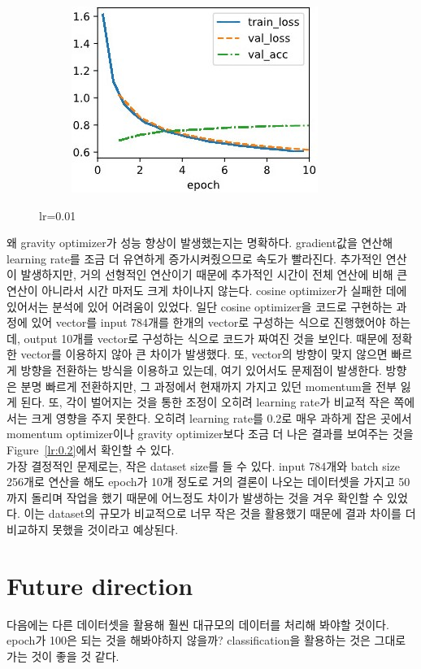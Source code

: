 \documentclass{article}
\begin{document}
\begin{figure}[ht]
\begin{center}
\begin{subfigure}[b]{0.3\columnwidth}
   \includegraphics[width=\columnwidth]{img/lr0.01 cosine0.01.jpg}
\end{subfigure}
\caption{lr=0.01}
\label{lr:0.01}
\end{center}
\end{figure}

왜 gravity optimizer가 성능 향상이 발생했는지는 명확하다. gradient값을 연산해 learning rate를 조금 더 유연하게 증가시켜줬으므로 속도가 빨라진다. 추가적인 연산이 발생하지만, 거의 선형적인 연산이기 때문에 추가적인 시간이 전체 연산에 비해 큰 연산이 아니라서 시간 마저도 크게 차이나지 않는다.
cosine optimizer가 실패한 데에 있어서는 분석에 있어 어려움이 있었다. 일단 cosine optimizer을 코드로 구현하는 과정에 있어 vector를 input 784개를 한개의 vector로 구성하는 식으로 진행했어야 하는데, output 10개를 vector로 구성하는 식으로 코드가 짜여진 것을 보인다. 때문에 정확한 vector를 이용하지 않아 큰 차이가 발생했다. 또, vector의 방향이 맞지 않으면 빠르게 방향을 전환하는 방식을 이용하고 있는데, 여기 있어서도 문제점이 발생한다. 방향은 분명 빠르게 전환하지만, 그 과정에서 현재까지 가지고 있던 momentum을 전부 잃게 된다. 또, 각이 벌어지는 것을 통한 조정이 오히려 learning rate가 비교적 작은 쪽에서는 크게 영향을 주지 못한다. 오히려 learning rate를 0.2로 매우 과하게 잡은 곳에서 momentum optimizer이나 gravity optimizer보다 조금 더 나은 결과를 보여주는 것을 Figure~\ref{lr:0.2}에서 확인할 수 있다.\\
가장 결정적인 문제로는, 작은 dataset size를 들 수 있다. input 784개와 batch size 256개로 연산을 해도 epoch가 10개 정도로 거의 결론이 나오는 데이터셋을 가지고 50까지 돌리며 작업을 했기 때문에 어느정도 차이가 발생하는 것을 겨우 확인할 수 있었다. 이는 dataset의 규모가 비교적으로 너무 작은 것을 활용했기 때문에 결과 차이를 더 비교하지 못했을 것이라고 예상된다.

\section{Future direction}
다음에는 다른 데이터셋을 활용해 훨씬 대규모의 데이터를 처리해 봐야할 것이다. epoch가 100은 되는 것을 해봐야하지 않을까?
classification을 활용하는 것은 그대로 가는 것이 좋을 것 같다.



\clearpage
\end{document}
